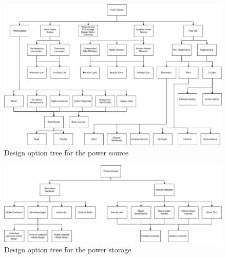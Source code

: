 \begin{figure}
\centering
\includegraphics[width=1.0\textwidth, angle=90]{chapters/img/DOTeps_source.jpg}
\caption{Design option tree for the power source}
\label{pic_DOTeps_source}
\end{figure}

\begin{figure}
\centering
\includegraphics[width=1.0\textwidth, angle=90]{chapters/img/DOTeps_storage.jpg}
\caption{Design option tree for the power storage}
\label{pic_DOTeps_storage}
\end{figure}

